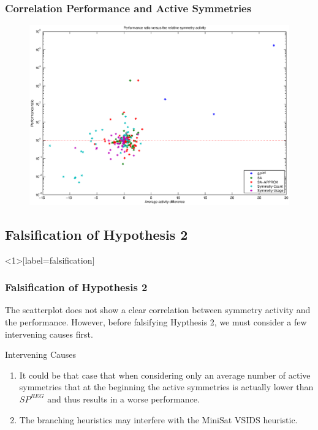 \documentclass{beamer}
\begin{document}
	\begin{frame}[plain]
		\frametitle{Correlation Performance and Active Symmetries}
		\begin{figure}
			\center
			\centerline{\includegraphics[width=1.3\textwidth]{../results/scatterplot_activity.eps}}
			\label{fig:correlation}
		\end{figure}
	\end{frame}

	\subsection{Falsification of Hypothesis 2}
	\begin{frame}[label=falsification]
		\frametitle{Falsification of Hypothesis 2}
		The scatterplot does not show a clear correlation between symmetry activity and the performance.
		However, before falsifying Hypthesis 2, we must consider a few intervening causes first.
		\begin{block}{Intervening Causes}
			\begin{enumerate}
				\item<1-> It could be that case that when considering only an average number of active symmetries
					that at the beginning the active symmetries is actually lower than $SP^{REG}$
					and thus results in a worse performance.
				\item<2-> The branching heuristics may interfere with the MiniSat VSIDS heuristic.
			\end{enumerate}
		\end{block}

	\end{frame}
\end{document}
